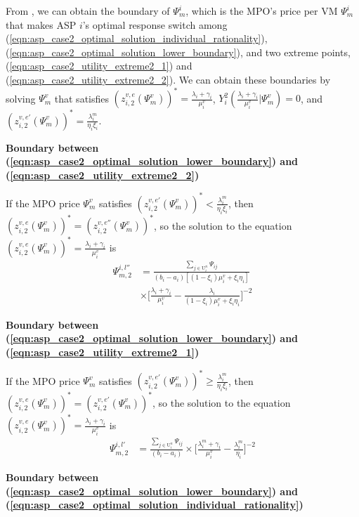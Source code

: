 \documentclass[10pt,journal, compsoc]{IEEEtran}
\begin{document}
From , we can obtain the boundary of $\Psi_m^i$, which is the MPO's price per VM $\Psi_m^i$ that makes ASP $i$'s optimal response switch among (\ref{eqn:asp_case2_optimal_solution_individual_rationality}), (\ref{eqn:asp_case2_optimal_solution_lower_boundary}), and two extreme points, (\ref{eqn:asp_case2_utility_extreme2_1}) and (\ref{eqn:asp_case2_utility_extreme2_2}). We can obtain these boundaries by solving $\Psi_m^v$ that satisfies $(z_{i,2}^{v,e}(\Psi_m^v))^* = \frac{\lambda_i+\gamma_i}{\mu_i^v}$,   $Y_i^2(\frac{\lambda_i+\gamma_i}{\mu_i^v}|\Psi_m^v) = 0$, and $(z_{i,2}^{v,e'}(\Psi_m^v))^*= \frac{\lambda_i^m}{\eta_i \xi_i}$.

\textbf{Boundary between (\ref{eqn:asp_case2_optimal_solution_lower_boundary}) and (\ref{eqn:asp_case2_utility_extreme2_2})}

If the MPO price $\Psi_m^v$ satisfies $(z_{i,2}^{v,e'}(\Psi_m^v))^* < \frac{\lambda_i^m}{\eta_i\xi_i}$, then $(z_{i,2}^{v,e}(\Psi_m^v))^* = (z_{i,2}^{v,e''}(\Psi_m^v))^*$, so the solution to the equation $(z_{i,2}^{v,e}(\Psi_m^v))^* = \frac{\lambda_i+\gamma_i}{\mu_i^v}$ is
\begin{equation}
\begin{aligned}
\Psi_{m,2}^{i,l''}&= \frac{\sum_{j \in \mathrm{U}_i^n}\Psi_{ij}}{(b_i-a_i)[(1-\xi_i)\mu_i^v + \xi_i \eta_i]}\\
&\times \big[\frac{\lambda_i+\gamma_i}{\mu_i^v} - \frac{\lambda_i}{(1-\xi_i)\mu_i^v + \xi_i\eta_i}\big]^{-2}
\end{aligned}
\end{equation}

\textbf{Boundary between (\ref{eqn:asp_case2_optimal_solution_lower_boundary}) and (\ref{eqn:asp_case2_utility_extreme2_1})}

If the MPO price $\Psi_m^v$ satisfies $(z_{i,2}^{v,e'}(\Psi_m^v))^* \geq \frac{\lambda_i^m}{\eta_i\xi_i}$, then $(z_{i,2}^{v,e}(\Psi_m^v))^* = (z_{i,2}^{v,e'}(\Psi_m^v))^*$, so the solution to the equation $(z_{i,2}^{v,e}(\Psi_m^v))^* = \frac{\lambda_i+\gamma_i}{\mu_i^v}$ is
\begin{equation}
\begin{aligned}
\Psi_{m,2}^{i,l'}&= \frac{\sum_{j \in \mathrm{U}_i^n}\Psi_{ij}}{(b_i-a_i)}  \times \big[\frac{\lambda_i^m+\gamma_i}{\mu_i^v}-\frac{\lambda_i^m}{\eta_i}\big]^{-2}
\end{aligned}
\end{equation}

\textbf{Boundary between (\ref{eqn:asp_case2_optimal_solution_lower_boundary}) and (\ref{eqn:asp_case2_optimal_solution_individual_rationality})}
\end{document}
